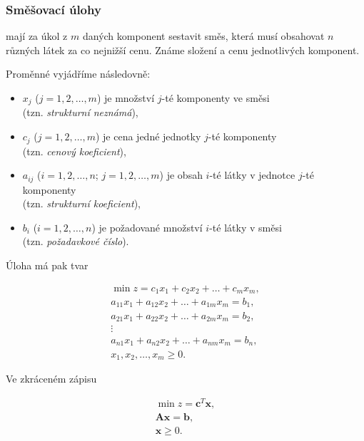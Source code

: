 \subsubsection{Směšovací úlohy}
mají za úkol z $m$ daných komponent sestavit směs, která musí obsahovat $n$ různých látek za co nejnižší cenu.
Známe složení a cenu jednotlivých komponent.

Proměnné vyjádříme následovně:

\begin{itemize}[label={}]
    \item $x_j$ ($j = 1, 2, \ldots, m$) je množství $j$-té komponenty ve směsi \\(tzn. \textit{strukturní neznámá}),
    \item $c_j$ ($j = 1, 2, \ldots, m$) je cena jedné jednotky $j$-té komponenty \\(tzn. \textit{cenový koeficient}),
    \item $a_{ij}$ ($i = 1, 2, \ldots, n$; $j = 1, 2, \ldots, m$) je obsah $i$-té látky v jednotce $j$-té komponenty \\(tzn. \textit{strukturní koeficient}),
    \item $b_i$ ($i = 1, 2, \ldots, n$) je požadované množství $i$-té látky v směsi \\(tzn. \textit{požadavkové číslo}).
\end{itemize}

Úloha má pak tvar

\begin{equation}
    \begin{gathered}
        \min z = c_1x_1 + c_2x_2 + \ldots + c_mx_m, \\
        a_{11}x_1 + a_{12}x_2 + \ldots + a_{1m}x_m = b_1, \\
        a_{21}x_1 + a_{22}x_2 + \ldots + a_{2m}x_m = b_2, \\
        \vdots \\
        a_{n1}x_1 + a_{n2}x_2 + \ldots + a_{nm}x_m = b_n, \\
        x_1, x_2, \ldots, x_m \geq 0.
    \end{gathered}
\end{equation}

Ve zkráceném zápisu

\begin{equation}
    \begin{gathered}
        \min z = \bm{c}^T\bm{x}, \\
        \bm{A}\bm{x} = \bm{b}, \\
        \bm{x} \geq 0.
    \end{gathered}
\end{equation}

